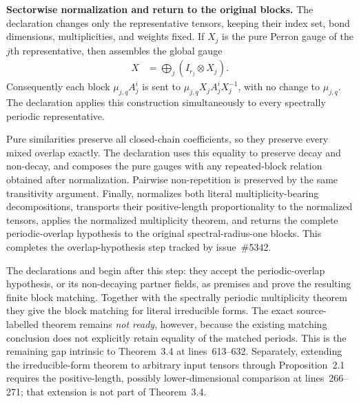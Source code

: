 \documentclass{article}
\begin{document}
\textbf{Sectorwise normalization and return to the original blocks.} The
declaration  changes only the
representative tensors, keeping their index set, bond dimensions,
multiplicities, and weights fixed.  If $X_j$ is the pure Perron gauge of the
$j$th representative, then
 assembles the
global gauge
\begin{align}
  X&=\bigoplus_j(I_{r_j}\otimes X_j).
\end{align}
Consequently each block $\mu_{j,q}A_j^i$ is sent to
$\mu_{j,q}X_jA_j^iX_j^{-1}$, with no change to $\mu_{j,q}$.
The declaration 
applies this construction simultaneously to every spectrally periodic
representative.

Pure similarities preserve all closed-chain coefficients, so they preserve
every mixed overlap exactly.  The declaration
 uses this equality to preserve
decay and non-decay, and composes the pure gauges with any repeated-block
relation obtained after normalization.  Pairwise non-repetition is preserved
by the same transitivity argument.  Finally,
normalizes both literal multiplicity-bearing decompositions, transports their
positive-length proportionality to the normalized tensors, applies the
normalized multiplicity theorem, and returns the complete periodic-overlap
hypothesis to the original spectral-radius-one blocks.  This completes the
overlap-hypothesis step tracked by issue~\#5342.

The declarations  and
 begin after
this step: they accept the periodic-overlap hypothesis, or its non-decaying
partner fields, as premises and prove the resulting finite block matching.
Together with the spectrally periodic multiplicity theorem they give the block
matching for literal irreducible forms.  The exact source-labelled theorem
remains \emph{not ready}, however, because the existing matching conclusion
does not explicitly retain equality of the matched periods.  This is the
remaining gap intrinsic to Theorem~3.4 at lines~613--632.  Separately,
extending the irreducible-form theorem to arbitrary input tensors through
Proposition~2.1 requires the positive-length, possibly lower-dimensional
comparison at lines~266--271; that extension is not part of Theorem~3.4.
\end{document}
